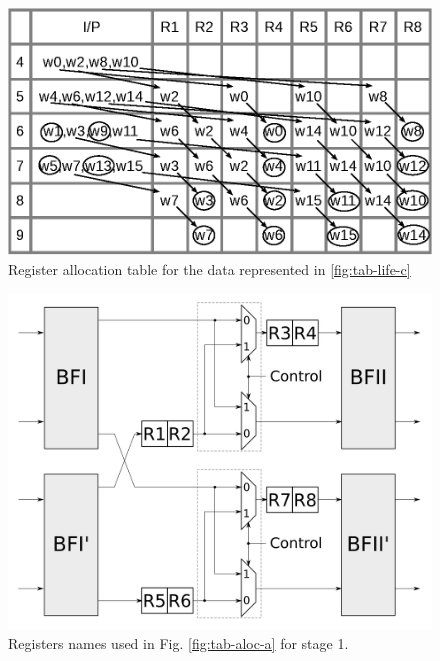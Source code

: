 \documentclass[10pt,times,mathptm,psfig,final,journal,comsoc]{IEEEtran}
\begin{document}
\begin{figure} 
\centering
 \includegraphics[width=0.95\linewidth]{Diagramas/tab_life_c.eps}
\caption{Register allocation table for the data represented in \ref{fig:tab-life-c}}
\label{fig:tab-aloc-c}
\end{figure}


    \begin{figure} 
        \centering
        \includegraphics[width=0.8\linewidth]{Diagramas/folding_stage1.png}
        \caption{Registers names used in Fig. \ref{fig:tab-aloc-a} for stage 1.}
        \label{fig:folding16_stage1}
    \end{figure}
\end{document}
